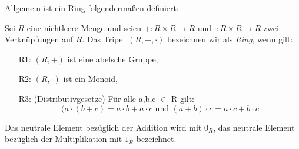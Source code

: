 Allgemein ist ein Ring folgendermaßen definiert:
\begin{defn}\label{Ring} %
Sei $R$ eine nichtleere Menge und seien $+ : R \times R \to R \text{ und } \cdot: R \times R \to R $ zwei Verknüpfungen auf $R$. Das Tripel $\left(R, +, \cdot\right)$ bezeichnen wir als \textit{Ring}, wenn gilt:
%
\begin{enumerate}
\item[R1:] $(R, +)$ ist eine abelsche Gruppe,
\item[R2:] $\left(R, \cdot\right)$ ist ein Monoid,
\item[R3:] (Distributivgesetze) Für alle a,b,c $\in$ R gilt:\\
\[(a \cdot(b +c) = a \cdot b + a \cdot c \text{ und }
(a+b) \cdot c = a \cdot c + b \cdot c \] 
\end{enumerate}
\end{defn}
Das neutrale Element bezüglich der Addition wird mit \textbf{$0_R$}, das neutrale Element bezüglich der Multiplikation mit \textbf{$1_R$} bezeichnet.
 
